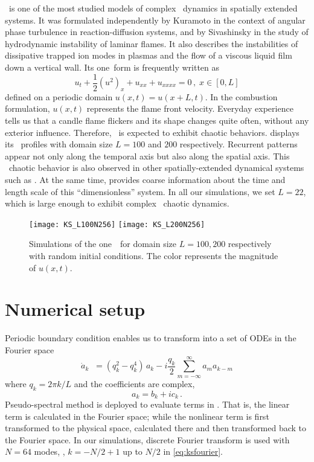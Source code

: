 \KSe\ is one of the most studied models of 
complex \spt\ dynamics in spatially extended systems.
It was formulated
independently by Kuramoto in the context of angular phase
turbulence in reaction-diffusion systems, and
by Sivashinsky in the study of hydrodynamic instability of laminar
flames. 
It also describes the instabilities of 
dissipative trapped ion modes in plasmas and the 
flow of a viscous liquid film down a vertical wall.
Its one\dmn\ form is frequently written as 
\begin{equation}
  u_t+\frac{1}{2}(u^2)_x+u_{xx}+u_{xxxx}=0\,,\; x\in [0,L]
  \label{eq:ks}
\end{equation}
defined on a periodic domain $u(x, t) = u(x+L, t)$.
In the combustion formulation, $u(x, t)$ represents the 
flame front velocity. Everyday experience tells us that a candle flame
flickers and its shape changes quite often, without any exterior influence. 
Therefore, \KSe\ is expected to exhibit chaotic behaviors. 
 displays its \spt\ profiles with 
domain size $L=100$ and $200$ respectively. Recurrent patterns appear not 
only along the temporal axis but also along the spatial axis. This \spt\ 
chaotic behavior is also observed in other spatially-extended dynamical 
systems such as \cGLe\rf{SPScgl92}.
At the same time,  provides coarse information about
the time and length scale of this ``dimensionless'' system. 
In all our simulations, we set $L = 22$, which is large enough to exhibit
complex \spt\ chaotic dynamics{\rf{SCD07}}.

\begin{figure}
  \centering
  \texttt{[image: KS\_L100N256]}
  \texttt{[image: KS\_L200N256]}
  \caption[\Spt\ plots of the one\dmn\ \KSe\ for $L=100$ and $200$.]{
    Simulations of the one\dmn\ \KSe\ for domain size $L=100, 200$ respectively with random initial
    conditions. The color represents the magnitude of $u(x, t)$.
  }
  \label{fig:KS_L100200}
\end{figure}


\section{Numerical setup}
\label{sect:ksnumer}

Periodic boundary condition enables us to transform 
into a set of ODEs in the Fourier space
\begin{equation}
\dot{a}_k \;\; =
( q_k^2 - q_k^4 )\, a_k
- i \frac{q_k}{2} \sum_{m=-\infty}^{\infty}a_m a_{k-m}
\label{eq:ksfourier}
\end{equation}
where $q_k = 2\pi k/L$ and the coefficients are complex,
\[
  a_{k}=b_{k}+ic_{k}\,.
\] 
Pseudo-spectral method 
is deployed to evaluate terms in . That is, the linear term is 
calculated in the Fourier space; while the nonlinear term is first transformed 
to the physical space, calculated there and then transformed back to the Fourier space.
In our simulations, discrete Fourier transform
is used with $N=64$ modes, \ie, $k = -N/2 + 1$ up to $N/2$ in \eqref{eq:ksfourier}.

